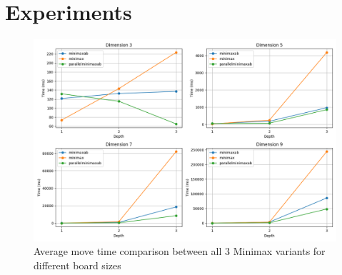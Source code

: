 \chapter{Experiments}

\begin{figure}[!ht]
    \centering
    \includegraphics[width=1.15\linewidth]{../img/performance.png}
    \caption{Average move time comparison between all 3 Minimax variants for different board sizes}
    \label{fig:minimax_performance_comp}
\end{figure}